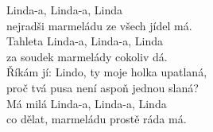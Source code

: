 
\nv{}Linda-a, Linda-a, Linda\\
nejradši marmeládu ze všech jídel má. \nc{}\\
Tahleta Linda-a, Linda-a, Linda\\
za soudek marmelády cokoliv dá.\\
Říkám jí: Lindo, ty moje holka upatlaná,\\
proč tvá pusa není aspoň jednou slaná?\\
Má milá Linda-a, Linda-a, Linda\\
co dělat, marmeládu prostě ráda má. \nc{}
\newpage
